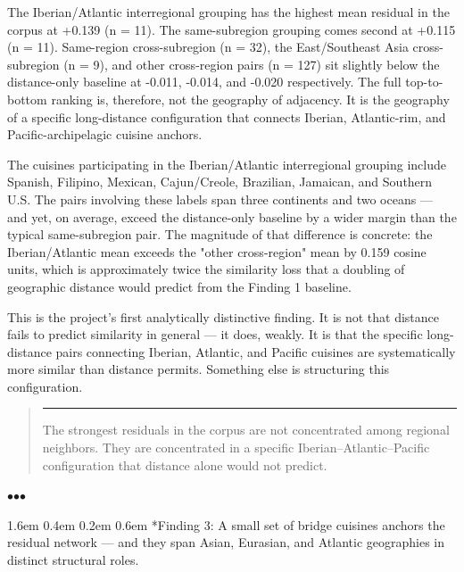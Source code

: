 \documentclass[11pt]{article}
\makeatletter
\renewcommand\section{\@startsection{section}{1}{\z@}%
  {1.6em \@plus 0.4em \@minus 0.2em}%
  {0.6em}%
  {\normalfont\Large\bfseries\color{black!85}}}
\newenvironment{pullquote}
  {\begin{quote}\itshape\color{black!72}\hspace*{-0.4em}\rule{2pt}{1em}\hspace{0.6em}}
  {\end{quote}}
\newcommand{\sectionbreak}{%
  \par\nobreak\vspace{0.8em}%
  \par\centerline{\textcolor{black!40}{$\bullet$\quad$\bullet$\quad$\bullet$}}%
  \par\vspace{0.6em}\nobreak%
}
\makeatother
\begin{document}
The Iberian/Atlantic interregional grouping has the highest mean residual in the corpus at +0.139 (n = 11). The same-subregion grouping comes second at +0.115 (n = 11). Same-region cross-subregion (n = 32), the East/Southeast Asia cross-subregion (n = 9), and other cross-region pairs (n = 127) sit slightly below the distance-only baseline at -0.011, -0.014, and -0.020 respectively. The full top-to-bottom ranking is, therefore, not the geography of adjacency. It is the geography of a specific long-distance configuration that connects Iberian, Atlantic-rim, and Pacific-archipelagic cuisine anchors.


The cuisines participating in the Iberian/Atlantic interregional grouping include Spanish, Filipino, Mexican, Cajun/Creole, Brazilian, Jamaican, and Southern U.S. The pairs involving these labels span three continents and two oceans — and yet, on average, exceed the distance-only baseline by a wider margin than the typical same-subregion pair. The magnitude of that difference is concrete: the Iberian/Atlantic mean exceeds the "other cross-region" mean by 0.159 cosine units, which is approximately twice the similarity loss that a doubling of geographic distance would predict from the Finding 1 baseline.


This is the project's first analytically distinctive finding. It is not that distance fails to predict similarity in general — it does, weakly. It is that the specific long-distance pairs connecting Iberian, Atlantic, and Pacific cuisines are systematically more similar than distance permits. Something else is structuring this configuration.


\begin{pullquote}
The strongest residuals in the corpus are not concentrated among regional neighbors. They are concentrated in a specific Iberian–Atlantic–Pacific configuration that distance alone would not predict.
\end{pullquote}


\sectionbreak


\section*{Finding 3: A small set of bridge cuisines anchors the residual network — and they span Asian, Eurasian, and Atlantic geographies in distinct structural roles.}
\end{document}
